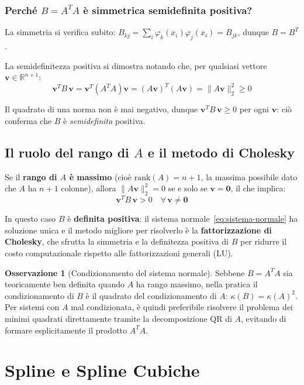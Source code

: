 \documentclass[a4paper,12pt]{article}
\theoremstyle{definition}
\newtheorem{osservazione}{Osservazione}[section]
\theoremstyle{remark}
\begin{document}
\subsubsection*{Perché $B = A^TA$ è simmetrica semidefinita positiva?}

La simmetria si verifica subito: $B_{kj} = \sum_i \varphi_k(x_i)\varphi_j(x_i)
= B_{jk}$, dunque $B = B^T$.

La semidefinitezza positiva si dimostra notando che, per qualsiasi
vettore $\mathbf{v} \in \mathbb{R}^{n+1}$:
\[
  \mathbf{v}^T B\,\mathbf{v}
  = \mathbf{v}^T (A^T A)\mathbf{v}
  = (A\mathbf{v})^T (A\mathbf{v})
  = \|A\mathbf{v}\|_2^2
  \ge 0
\]

\noindent Il quadrato di una norma non è mai negativo, dunque
$\mathbf{v}^T B\,\mathbf{v} \ge 0$ per ogni $\mathbf{v}$: ciò
conferma che $B$ è \emph{semidefinita} positiva.

\subsection{Il ruolo del rango di $A$ e il metodo di Cholesky}

Se il \textbf{rango di $A$ è massimo} (cioè $\mathrm{rank}(A) = n+1$,
la massima possibile dato che $A$ ha $n+1$ colonne), allora
$\|A\mathbf{v}\|_2^2 = 0$ se e solo se $\mathbf{v} = \mathbf{0}$,
il che implica:
\[
  \mathbf{v}^T B\,\mathbf{v} > 0 \quad \forall\,\mathbf{v} \ne \mathbf{0}
\]

\noindent In questo caso $B$ è \textbf{definita positiva}: il sistema
normale~\eqref{eq:sistema-normale} ha soluzione unica e il metodo
migliore per risolverlo è la \textbf{fattorizzazione di Cholesky},
che sfrutta la simmetria e la definitezza positiva di $B$ per ridurre
il costo computazionale rispetto alle fattorizzazioni generali (LU).

\begin{osservazione}[Condizionamento del sistema normale]
Sebbene $B = A^T A$ sia teoricamente ben definita quando $A$ ha
rango massimo, nella pratica il condizionamento di $B$ è il
quadrato del condizionamento di $A$: $\kappa(B) = \kappa(A)^2$.
Per sistemi con $A$ mal condizionata, è quindi preferibile
risolvere il problema dei minimi quadrati direttamente tramite la
decomposizione QR di $A$, evitando di formare esplicitamente il
prodotto $A^T A$.
\end{osservazione}


\section{Spline e Spline Cubiche}
\end{document}
